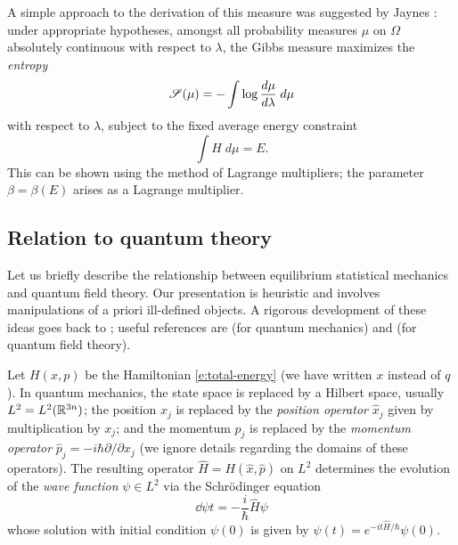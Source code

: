 A simple approach to the derivation of this measure was suggested by Jaynes \cite{Jaynes57}:
under appropriate hypotheses, amongst all probability measures $\mu$ on $\Omega$ absolutely
continuous with respect to $\lambda$, the Gibbs measure maximizes the \emph{entropy}
\begin{equation}
\label{e:entropy-def}
\mathscr{S}(\mu) = -\int \log \frac{d\mu}{d\lambda} \; d\mu
\end{equation}
with respect to $\lambda$, subject to the fixed average energy constraint
\begin{equation}
\label{e:fix-avg-energy}
\int H \; d\mu = E.
\end{equation}
This can be shown using the method of Lagrange multipliers;
the parameter $\beta = \beta(E)$ arises as a Lagrange multiplier.


\subsection{Relation to quantum theory}
\label{sec:quantum}

Let us briefly describe the relationship between equilibrium statistical
mechanics and quantum field theory. Our presentation is heuristic and involves
manipulations of a priori ill-defined objects. A rigorous development of these
ideas goes back to \cite{Syma69,Nelson73,OS73,OS75}; useful references are
\cite{Simon05} (for quantum mechanics) and \cite{GJ87} (for quantum
field theory).

Let $H(x, p)$ be the Hamiltonian \eqref{e:total-energy} (we have written $x$
instead of $q$). In quantum mechanics, the state space is replaced by a Hilbert
space, usually $L^2 = L^2({\mathbb R}^{3n})$;
the position $x_j$ is replaced by the \emph{position operator} $\hat x_j$ given by
multiplication by $x_j$; and the momentum $p_j$ is replaced by the \emph{momentum
operator} $\hat p_j = -i \hbar \partial/\partial x_j$ (we ignore details regarding
the domains of these operators). The resulting operator $\hat H = H(\hat x, \hat p)$
on $L^2$ determines the evolution of the \emph{wave function} $\psi\in L^2$ via
the Schr\"{o}dinger equation
\begin{equation}
\dd{\psi}{t} = -\frac{i}{\hbar} \hat H \psi
\end{equation}
whose solution with initial condition $\psi(0)$ is given by
$\psi(t) = e^{-it\hat H/\hbar} \psi(0)$.

